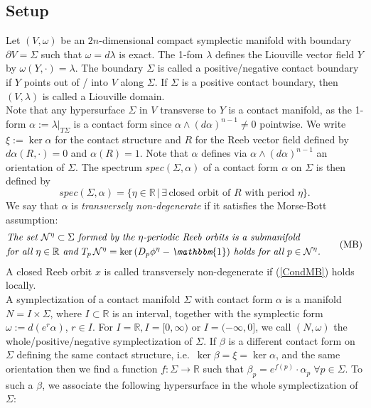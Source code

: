 \documentclass[a4paper,12pt,bibliography=totocnumbered,titlepage=false,abstracton,bookmarksnumbered=true]{scrartcl}
\theoremstyle{definition}
\begin{document}
\subsection{Setup}\label{secsetup}
Let $(V,\omega)$ be an $2n$-dimensional compact symplectic manifold with boundary $\partial V= \Sigma$ such that $\omega =d\lambda$ is exact. The 1-fom $\lambda$ defines the Liouville vector field $Y$ by $\omega(Y,\cdot)=\lambda$. The boundary $\Sigma$ is called a positive/negative contact boundary if $Y$ points out of / into $V$ along $\Sigma$. If $\Sigma$ is a positive contact boundary, then $(V,\lambda)$ is called a Liouville domain.\\
Note that any hypersurface $\Sigma$ in $V$ transverse to $Y$ is a contact manifold, as the 1-form $\alpha:=\lambda|_{T\Sigma}$ is a contact form since $\alpha{\wedge}(d\alpha)^{n-1}\neq0$ pointwise. We write $\xi:=\ker \alpha$ for the contact structure and $R$ for the Reeb vector field defined by $d\alpha(R,\cdot)= 0$ and $\alpha(R)=1$. Note that $\alpha$ defines via $\alpha\wedge(d\alpha)^{n-1}$ an orientation of $\Sigma$. The spectrum $spec(\Sigma,\alpha)$ of a contact form $\alpha$ on $\Sigma$ is then defined by
\[spec(\Sigma,\alpha)=\{\eta\in\mathbb{R}\,|\,\exists\, \text{closed orbit of $R$ with period $\eta$}\}.\]
We say that $\alpha$ is \textit{transversely non-degenerate} if it satisfies the Morse-Bott assumption:
\begin{equation}\label{CondMB}\begin{aligned}
 &\textit{The set $\mathcal{N}^\eta\subset\Sigma$ formed by the $\eta$-periodic Reeb orbits is a submanifold}\\
 &\textit{for all $\eta\in\mathbb{R}$ and $T_p\,\mathcal{N}^\eta = \ker \left(D_p\phi^\eta - \mathbbm{1}\right)$ holds for all $p\in\mathcal{N}^\eta$.}
 \end{aligned}\tag{MB}
\end{equation}
A closed Reeb orbit $x$ is called transversely non-degenerate if (\ref{CondMB}) holds locally.\\
A symplectization of a contact manifold $\Sigma$ with contact form $\alpha$ is a manifold $N=I\times\Sigma$, where $I\subset\mathbb{R}$ is an interval, together with the symplectic form $\omega:=d(e^r\alpha)$, $r\in I$. For $I=\mathbb{R}, I=[0,\infty)$ or $I=(-\infty,0]$, we call $(N,\omega)$ the whole/positive/negative symplectization of $\Sigma$. If $\beta$ is a different contact form on $\Sigma$ defining the same contact structure, i.e.\ $\ker \beta = \xi=\ker\alpha$,  and the same orientation then we find a function $f:\Sigma\rightarrow\mathbb{R}$ such that $\beta_p=e^{f(p)}{\cdot} \alpha_p \;\forall p\in\Sigma$. To such a $\beta$, we associate the following hypersurface in the whole symplectization of $\Sigma$:
\end{document}

